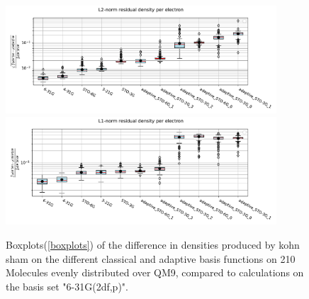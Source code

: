 \begin{figure}
    \centering
    \includegraphics[width=0.9\textwidth]{chapters/results/results_images/adaptive_basis_functions/L2-norm_residual_density_per_electron_adaptive_basis_sets}
    \includegraphics[width=0.9\textwidth]{chapters/results/results_images/adaptive_basis_functions/L1-norm_residual_density_per_electron_adaptive_basis_sets}
    \caption{Boxplots(\ref{boxplots}) of the difference in densities produced by kohn sham on the different classical and adaptive basis functions on 210 Molecules evenly distributed over QM9, compared to calculations on the basis set "6-31G(2df,p)".}
    \label{fig:residual_density_adaptive_basis_sets}
\end{figure}

